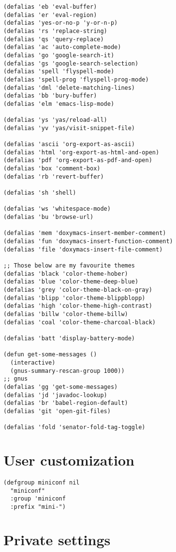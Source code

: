 \documentclass[11pt]{article}
\begin{document}
\begin{verbatim}
(defalias 'eb 'eval-buffer)
(defalias 'er 'eval-region)
(defalias 'yes-or-no-p 'y-or-n-p)
(defalias 'rs 'replace-string)
(defalias 'qs 'query-replace)
(defalias 'ac 'auto-complete-mode)
(defalias 'go 'google-search-it)
(defalias 'gs 'google-search-selection)
(defalias 'spell 'flyspell-mode)
(defalias 'spell-prog 'flyspell-prog-mode)
(defalias 'dml 'delete-matching-lines)
(defalias 'bb 'bury-buffer)
(defalias 'elm 'emacs-lisp-mode)

(defalias 'ys 'yas/reload-all)
(defalias 'yv 'yas/visit-snippet-file)

(defalias 'ascii 'org-export-as-ascii)
(defalias 'html 'org-export-as-html-and-open)
(defalias 'pdf 'org-export-as-pdf-and-open)
(defalias 'box 'comment-box)
(defalias 'rb 'revert-buffer)

(defalias 'sh 'shell)

(defalias 'ws 'whitespace-mode)
(defalias 'bu 'browse-url)

(defalias 'mem 'doxymacs-insert-member-comment)
(defalias 'fun 'doxymacs-insert-function-comment)
(defalias 'file 'doxymacs-insert-file-comment)

;; Those below are my favourite themes
(defalias 'black 'color-theme-hober)
(defalias 'blue 'color-theme-deep-blue)
(defalias 'grey 'color-theme-black-on-gray)
(defalias 'blipp 'color-theme-blippblopp)
(defalias 'high 'color-theme-high-contrast)
(defalias 'billw 'color-theme-billw)
(defalias 'coal 'color-theme-charcoal-black)

(defalias 'batt 'display-battery-mode)

(defun get-some-messages ()
  (interactive)
  (gnus-summary-rescan-group 1000))
;; gnus
(defalias 'gg 'get-some-messages)
(defalias 'jd 'javadoc-lookup)
(defalias 'br 'babel-region-default)
(defalias 'git 'open-git-files)

(defalias 'fold 'senator-fold-tag-toggle)
\end{verbatim}
\section{User customization}
\label{sec-16}

\begin{verbatim}
(defgroup miniconf nil
  "miniconf"
  :group 'miniconf
  :prefix "mini-")
\end{verbatim}
\section{Private settings}
\label{sec-17}
\end{document}

